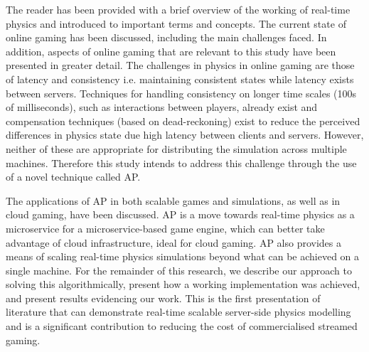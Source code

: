 The reader has been provided with a brief overview of the working of real-time physics and introduced to important terms and concepts. The current state of online gaming has been discussed, including the main challenges faced. In addition, aspects of online gaming that are relevant to this study have been presented in greater detail. The challenges in physics in online gaming are those of latency and consistency i.e. maintaining consistent states while latency exists between servers. Techniques for handling consistency on longer time scales (100s of milliseconds), such as interactions between players, already exist and compensation techniques (based on dead-reckoning) exist to reduce the perceived differences in physics state due high latency between clients and servers. However, neither of these are appropriate for distributing the simulation across multiple machines. Therefore this study intends to address this challenge through the use of a novel technique called AP.

The applications of AP in both scalable games and simulations, as well as in cloud gaming, have been discussed. AP is a move towards real-time physics as a microservice for a microservice-based game engine, which can better take advantage of cloud infrastructure, ideal for cloud gaming. AP also provides a means of scaling real-time physics simulations beyond what can be achieved on a single machine.
For the remainder of this research, we describe our approach to solving this algorithmically, present how a working implementation was achieved, and present results evidencing our work. This is the first presentation of literature that can demonstrate real-time scalable server-side physics modelling and is a significant contribution to reducing the cost of commercialised streamed gaming.

